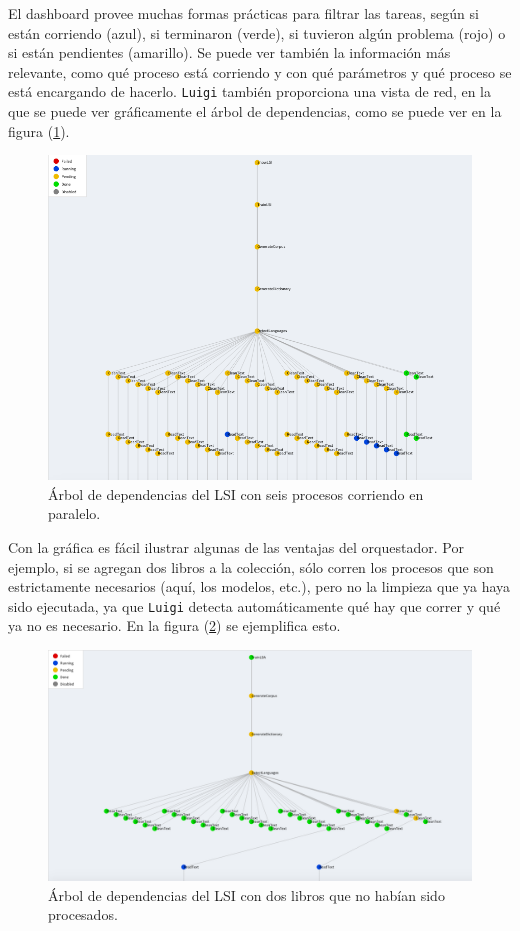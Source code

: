El dashboard provee muchas formas prácticas para filtrar las tareas, según si están corriendo (azul), si terminaron (verde), si tuvieron algún problema (rojo) o si están pendientes (amarillo). Se puede ver también la información más relevante, como qué proceso está corriendo y con qué parámetros y qué proceso se está encargando de hacerlo. \texttt{Luigi} también proporciona una vista de red, en la que se puede ver gráficamente el árbol de dependencias, como se puede ver en la figura (\ref{fig:lsi-tree}).

\begin{figure}[H]
\centering
\includegraphics[width=1\textwidth]{Figures/detail.png}
\caption{Árbol de dependencias del LSI con seis procesos corriendo en paralelo.\label{fig:lsi-tree}}
\end{figure}


Con la gráfica es fácil ilustrar algunas de las ventajas del orquestador. Por ejemplo, si se agregan dos libros a la colección, sólo corren los procesos que son estrictamente necesarios (aquí, los modelos, etc.), pero no la limpieza que ya haya sido ejecutada, ya que  \texttt{Luigi} detecta automáticamente qué hay que correr y qué ya no es necesario. En la figura (\ref{fig:luigi-parallel}) se ejemplifica esto.


\begin{figure}[H]
\centering
\includegraphics[width=1\textwidth]{Figures/detail2.png}
\caption{Árbol de dependencias del LSI con dos libros que no habían sido procesados.\label{fig:luigi-parallel}}
\end{figure}

